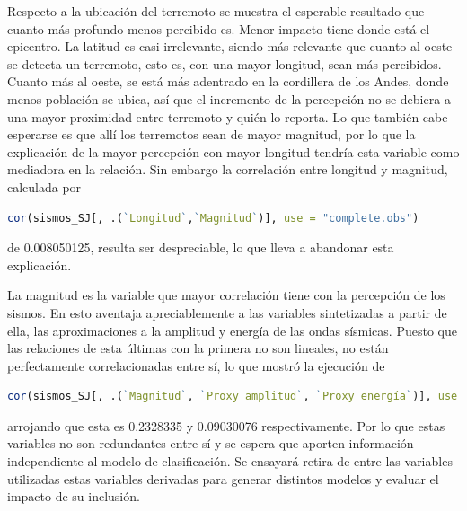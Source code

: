 \documentclass[a4paper]{report}
\begin{document}
Respecto a la ubicación del terremoto se muestra el esperable resultado que cuanto más profundo menos percibido es.
Menor impacto tiene donde está el epicentro.
La latitud es casi irrelevante, siendo más relevante que cuanto al oeste se detecta un terremoto, esto es, con una mayor longitud, sean más percibidos.
Cuanto más al oeste, se está más adentrado en la cordillera de los Andes, donde menos población se ubica, así que el incremento de la percepción no se debiera a una mayor proximidad entre terremoto y quién lo reporta.
Lo que también cabe esperarse es que allí los terremotos sean de mayor magnitud, por lo que la explicación de la mayor percepción con mayor longitud tendría esta variable como mediadora en la relación.
Sin embargo la correlación entre longitud y magnitud, calculada por
\begin{lstlisting}[breaklines=true, language=R]
cor(sismos_SJ[, .(`Longitud`,`Magnitud`)], use = "complete.obs")
\end{lstlisting}
de \num{0.008050125}, resulta ser despreciable, lo que lleva a abandonar esta explicación.

La magnitud es la variable que mayor correlación tiene con la percepción de los sismos.
En esto aventaja apreciablemente a las variables sintetizadas a partir de ella, las aproximaciones a la amplitud y energía de las ondas sísmicas.
Puesto que las relaciones de esta últimas con la primera no son lineales, no están perfectamente correlacionadas entre sí, lo que mostró la ejecución de  
\begin{lstlisting}[breaklines=true, language=R]
cor(sismos_SJ[, .(`Magnitud`, `Proxy amplitud`, `Proxy energía`)], use = "complete.obs")
\end{lstlisting}
arrojando que esta es \num{0.2328335} y \num{0.09030076} respectivamente.
Por lo que estas variables no son redundantes entre sí y se espera que aporten información independiente al modelo de clasificación.
Se ensayará retira de entre las variables utilizadas estas variables derivadas para generar distintos modelos y evaluar el impacto de su inclusión.





\end{document}
